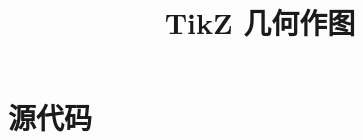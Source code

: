 \documentclass[a4paper, titlepage, 12pt]{ctexbook}
\title{TikZ 几何作图}
\begin{document}
\raggedbottom 

\frontmatter

\maketitle

\tableofcontents

\mainmatter





\appendix




\chapter{源代码}
\inputminted{latex}{../tikzlibraryeuclidea.code.tex}

\backmatter

\cleardoublepage
{}



\end{document}
